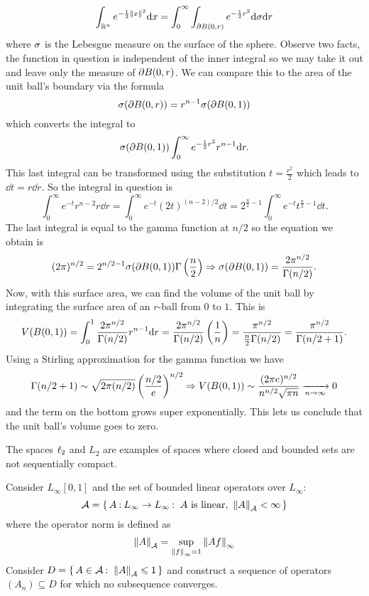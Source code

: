 \documentclass[12pt]{memoir}
\begin{document}
\begin{ptcbr}
\begin{enumerate}[i)]
        $$\int_{\bR^n}e^{-\half\norm{x}^2}\dd x=\int_0^\infty\int_{\del B(0,r)}e^{-\half r^2}\dd\sg\dd r$$
        where $\sigma$ is the Lebesgue measure on the surface of the sphere. Observe two facts, the function in question is independent of the inner integral so we may take it out and leave only the measure of $\partial B(0,r)$. We can compare this to the area of the unit ball's boundary via the formula 
        $$\sigma(\partial B(0,r))=r^{n-1}\sigma(\partial B(0,1))$$
        which converts the integral to 
        $$\sg(\del B(0,1))\int_0^\infty e^{-\half r^2}r^{n-1}\dd r.$$
        This last integral can be transformed using the substitution $t=\frac{r^2}{2}$ which leads to $\dd t= r\dd r$. So the integral in question is 
        $$\int_0^\infty e^{-t}r^{n-2}r\dd r=\int_0^\infty e^{-t}(2t)^{(n-2)/2}\dd t=2^{\frac{n}{2}-1}\int_0^\infty e^{-t}t^{\frac{n}{2}-1}\dd t.$$
        The last integral is equal to the gamma function at $n/2$ so the equation we obtain is 
        $$(2\pi)^{n/2}=2^{n/2-1}\sigma(\partial B(0,1))\Gamma\left(\frac{n}{2}\right)\Rightarrow\sigma(\partial B(0,1))=\frac{2\pi^{n/2}}{\Gamma(n/2)}.$$
        Now, with this surface area, we can find the volume of the unit ball by integrating the surface area of an $r$-ball from $0$ to $1$. This is 
        $$V(B(0,1))=\int_0^1\frac{2\pi^{n/2}}{\Gamma(n/2)}r^{n-1}\dd r=\frac{2\pi^{n/2}}{\Gamma(n/2)}\left(\frac{1}{n}\right)=\frac{\pi^{n/2}}{\frac{n}{2}\Gamma(n/2)}=\frac{\pi^{n/2}}{\Gamma(n/2+1)}.$$
        Using a Stirling approximation for the gamma function we have 
        $$\Gamma(n/2+1)\sim\sqrt{2\pi(n/2)}\left(\frac{n/2}{e}\right)^{n/2}\Rightarrow V(B(0,1))\sim \frac{(2\pi e)^{n/2}}{n^{n/2}\sqrt{\pi n}}\xrightarrow[n\to\infty]{}0$$
        and the term on the bottom grows super exponentially. This lets us conclude that the unit ball's volume goes to zero.
    \end{enumerate}
\end{ptcbr}
\newpage
\begin{Ej}
    The spaces $\ell_2$ and $L_2$ are examples of spaces where closed and bounded sets are not sequentially compact.\par 
    Consider $L_\infty[0,1]$ and the set of bounded linear operators over $L_\infty$: 
    $$\cA=\set{A\: L_\infty\to L_\infty\:\ A\ \text{is linear},\ \norm{A}_\cA<\infty}$$
    where the operator norm is defined as 
    $$\norm{A}_{\mathcal{A}}=\sup_{\norm{f}_{\infty}=1}\norm{Af}_{\infty}$$
    Consider $D=\{\,A\in\mathcal{A}\mathbin{:}\ \norm{A}_{\mathcal{A}}\leqslant 1\,\}$ and construct a sequence of operators $(A_n)\subseteq D$ for which no subsequence converges.
\end{Ej}
\end{document}
